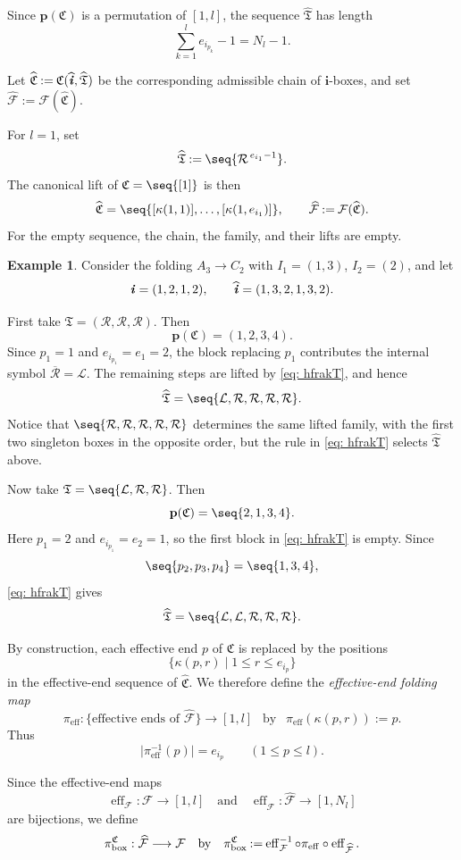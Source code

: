 \documentclass[12pt, leqno]{amsart}
\numberwithin{equation}{section}
\theoremstyle{plain}
\theoremstyle{definition}
\newtheorem{example}[lemma]{Example}
\renewcommand{\le}{\leqslant}
\newcommand{\seteq}{\mathbin{:=}}
\newcommand{\bx}{{\rm box}}
\newcommand{\ii}{ \textbf{\textit{i}}}
\newcommand{\eff}{\operatorname{eff}}
\newcommand{\hii}{{\widehat{\ii}}}
\newcommand{\ocalR}{\overline{\calR}}
\newcommand{\frakC}{\mathfrak{C}}
\newcommand{\frakT}{\mathfrak{T}}
\newcommand{\hfrakT}{{\widehat{\frakT}}}
\newcommand{\hfrakC}{\widehat{\frakC}}
\newcommand{\bfi}{\mathbf{i}}
\newcommand{\bfp}{\mathbf{p}}
\newcommand{\calF}{\mathcal{F}}
\newcommand{\calL}{\mathcal{L}}
\newcommand{\calR}{\mathcal{R}}
\newcommand{\hcalF}{{\widehat{\calF}}}
\newcommand{\qtq}[1][{and}]{\quad\text{{#1}}\quad}
\begin{document}
Since $\bfp(\frakC)$ is a permutation of $[1,l]$, the sequence
$\hfrakT$ has length
\[
\sum_{k=1}^l e_{i_{p_k}}-1=N_l-1.
\]

Let
$\hfrakC \seteq\frakC(\hii,\hfrakT)$
be the corresponding admissible chain of $\bfi$-boxes, and set
$\hcalF\seteq\calF(\hfrakC)$.

For $l=1$, set
\[
\hfrakT\seteq\seq{\calR^{\,e_{i_1}-1}}.
\]
The canonical lift of $\frakC=\seq{[1]}$ is then
\[
\hfrakC=\seq{[\kappa(1,1)],\ldots,[\kappa(1,e_{i_1})]},
\qquad
\hcalF\seteq\calF(\hfrakC).
\]
For the empty sequence, the chain, the family, and their lifts are empty.

\begin{example}\label{ex: lifted LR A3 C2}
Consider the folding $A_3\to C_2$ with $I_1=(1,3)$, $I_2=(2)$,
and let
\[
\ii=(1,2,1,2),
\qquad
\hii=(1,3,2,1,3,2).
\]

First take $\frakT=(\calR,\calR,\calR)$.
Then
\[
\bfp(\frakC)=(1,2,3,4).
\]
Since $p_1=1$ and $e_{i_{p_1}}=e_1=2$,  the block replacing $p_1${}
contributes the internal symbol $\ocalR=\calL$.
The remaining steps are lifted by \eqref{eq: hfrakT}, and hence \[
\hfrakT = \seq{\calL,\calR,\calR,\calR,\calR}.
\]
Notice that $\seq{\calR,\calR,\calR,\calR,\calR}$
 determines the same lifted family, with the first two singleton boxes
in the opposite order{}, but
 the rule in \eqref{eq: hfrakT} selects $\hfrakT$ above.

Now take $\frakT=\seq{\calL,\calR,\calR}$.
Then
\[
\bfp(\frakC)=\seq{2,1,3,4}.
\]
Here $p_1=2$ and $e_{i_{p_1}}=e_2=1$, so  the first block in
\eqref{eq: hfrakT} is empty{}. Since
\[
\seq{p_2,p_3,p_4}=\seq{1,3,4},
\]
\eqref{eq: hfrakT} gives \[
\hfrakT = \seq{\calL,\calL,\calR,\calR,\calR}.
\]
\end{example}

By construction,  each effective end $p$ of $\frakC$  is replaced by the
 positions
\[
\{\kappa(p,r)\mid 1\le r\le e_{i_p}\}
\]
in the effective-end sequence of $\hfrakC$.
We therefore define the \emph{effective-end folding map}
\[
\pi_{\eff}:
\{\text{effective ends of }\hcalF\}
\longrightarrow [1,l]
\ \ \text{ by } \ \
\pi_{\eff}(\kappa(p,r))\seteq p.
\]
Thus
\begin{equation}\label{eq: effective end fiber}
\bigl|\pi_{\eff}^{-1}(p)\bigr|=e_{i_p}
\qquad (1\le p\le l).
\end{equation}

Since the effective-end maps
\[
\eff_\calF:\calF\longrightarrow[1,l]
\qtq
\eff_{\hcalF}:\hcalF\longrightarrow[1,N_l]
\]
are bijections, we define
\begin{equation}\label{eq: box folding map}
\pi_{\bx}^{\frakC}:
\hcalF\longrightarrow\calF
\ \ \text{ by } \ \
\pi_{\bx}^{\frakC}
\seteq
\eff_\calF^{-1}\circ\pi_{\eff}\circ\eff_{\hcalF}.
\end{equation}
\end{document}

